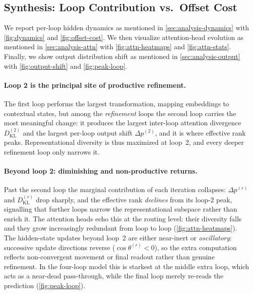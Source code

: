 \subsection{Synthesis: Loop Contribution vs.\ Offset Cost}
\label{sec:analysis-synthesis}

We report per-loop hidden dynamics as mentioned in \autoref{sec:analysis-dynamics} with \autoref{fig:dynamics}  and \autoref{fig:offset-cost}. We then visualize attention-head evolution as mentioned in \autoref{sec:analysis-attn} with
\autoref{fig:attn-heatmaps} and \autoref{fig:attn-stats}. Finally, we show output distribution shift as mentioned in \autoref{sec:analysis-output} with \autoref{fig:output-shift} and \autoref{fig:peak-loop}.

\paragraph{Loop 2 is the principal site of productive refinement.}
The first loop performs the largest transformation, mapping embeddings to
contextual states, but among the \emph{refinement} loops the second loop
carries the most meaningful change: it produces the largest inter-loop attention
divergence $D_{\text{KL}}^{(2)}$ and the largest per-loop output shift
$\Delta p^{(2)}$, and it is where effective rank peaks.
Representational diversity is thus maximized at loop~2, and every deeper
refinement loop only narrows it.

\paragraph{Beyond loop 2: diminishing and non-productive returns.}
Past the second loop the marginal contribution of each iteration collapses:
$\Delta p^{(r)}$ and $D_{\text{KL}}^{(r)}$ drop sharply, and the effective rank
\emph{declines} from its loop-2 peak, signalling that further loops narrow the
representational subspace rather than enrich it.
The attention heads echo this at the routing level: their diversity falls and
they grow increasingly redundant from loop to loop
(\autoref{fig:attn-heatmaps}).
The hidden-state updates beyond loop~2 are either near-inert or
\emph{oscillatory}: successive update directions reverse ($\cos\theta^{(r)}<0$),
so the extra computation reflects non-convergent movement or final readout
rather than genuine refinement.
In the four-loop model this is starkest at the middle extra loop, which acts as
a near-dead pass-through, while the final loop merely re-reads the prediction
(\autoref{fig:peak-loop}).


